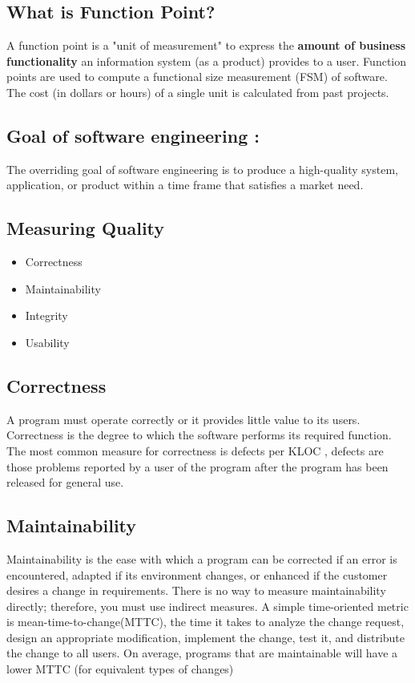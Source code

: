\documentclass[12pt]{article}
\begin{document}
\subsection{What is Function Point?}
A function point is a "unit of measurement" to express the \textbf{amount of business functionality} an information system (as a product) provides to a user. Function points are used to compute a functional size measurement (FSM) of software. The cost (in dollars or hours) of a single unit is calculated from past projects.



\subsection{Goal of software engineering : }

The overriding goal of software engineering is to produce a high-quality system,
application, or product within a time frame that satisfies a market need.




\subsection{Measuring Quality}


\begin{itemize}
	\item Correctness
	\item Maintainability
	\item Integrity
	\item Usability
\end{itemize}


\subsection{Correctness}
A program must operate correctly or it provides little value to
its users. Correctness is the degree to which the software performs its required function. The most common measure for correctness is defects per
KLOC , defects
are those problems reported by a user of the program after the program has
been released for general use.

\subsection{Maintainability}

Maintainability is the ease
with which a program can be corrected if an error is encountered, adapted
if its environment changes, or enhanced if the customer desires a change in
requirements. There is no way to measure maintainability directly; therefore, you must use indirect measures. A simple time-oriented metric is
mean-time-to-change(MTTC), the time it takes to analyze the change
request, design an appropriate modification, implement the change, test it,
and distribute the change to all users. On average, programs that are maintainable will have a lower MTTC  (for equivalent types of changes)
\end{document}
